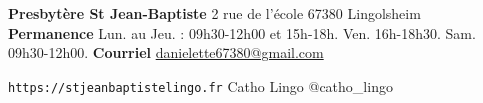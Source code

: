 \begin{framed}
\textbf{Presbytère St Jean-Baptiste}
2 rue de l'école 67380 Lingolsheim  \\
\textbf{Permanence} Lun. au Jeu. : 09h30-12h00 et 15h-18h. Ven. 16h-18h30. Sam. 09h30-12h00.
\textbf{Courriel} \href{mailto:danielette67380@gmail.com}{danielette67380@gmail.com}


\texttt{https://stjeanbaptistelingo.fr} \hfill \faFacebook Catho Lingo \hfill \faInstagram @catho\_lingo
\end{framed}

